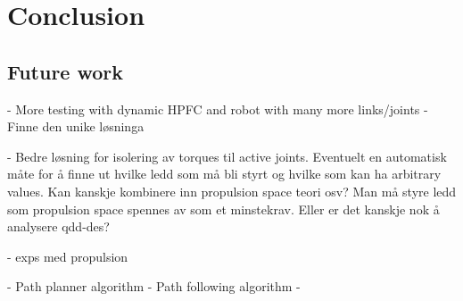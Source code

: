 \chapter{Conclusion}\label{conclusion}


\section{Future work}

- More testing with dynamic HPFC and robot with many more links/joints
- Finne den unike løsninga

- Bedre løsning for isolering av torques til active joints. Eventuelt en automatisk måte for å finne ut hvilke ledd som må bli styrt og hvilke som kan ha arbitrary values. Kan kanskje kombinere inn propulsion space teori osv? Man må styre ledd som propulsion space spennes av som et minstekrav.
Eller er det kanskje nok å analysere qdd-des?

- exps med propulsion

- Path planner algorithm
- Path following algorithm
- 